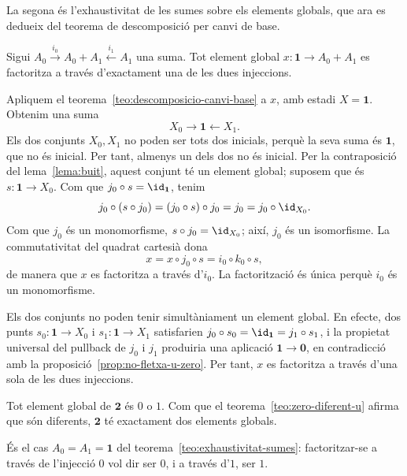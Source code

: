La segona és l'exhaustivitat de les sumes sobre els elements globals, que ara es dedueix del teorema de descomposició per canvi de base.

\begin{teorema}\label{teo:exhaustivitat-sumes}
Sigui \(A_0\xrightarrow{i_0}A_0+A_1\xleftarrow{i_1}A_1\) una suma. Tot element global \(x:\mathbf1\to A_0+A_1\) es factoritza a través d'exactament una de les dues injeccions.
\end{teorema}

\begin{prova}
Apliquem el teorema~\ref{teo:descomposicio-canvi-base} a \(x\), amb estadi \(X=\mathbf1\). Obtenim una suma
\[
X_0\longrightarrow\mathbf1\longleftarrow X_1.
\]
Els dos conjunts \(X_0,X_1\) no poden ser tots dos inicials, perquè la seva suma és \(\mathbf1\), que no és inicial. Per tant, almenys un dels dos no és inicial. Per la contraposició del lema~\ref{lema:buit}, aquest conjunt té un element global; suposem que és \(s:\mathbf1\to X_0\). Com que \(j_0\circ s=\id_{\mathbf1}\), tenim
\[
j_0\circ(s\circ j_0)=(j_0\circ s)\circ j_0=j_0=j_0\circ\id_{X_0}.
\]
Com que \(j_0\) és un monomorfisme, \(s\circ j_0=\id_{X_0}\); així, \(j_0\) és un isomorfisme. La commutativitat del quadrat cartesià dona
\[
x=x\circ j_0\circ s=i_0\circ k_0\circ s,
\]
de manera que \(x\) es factoritza a través d'\(i_0\). La factorització és única perquè \(i_0\) és un monomorfisme.

Els dos conjunts no poden tenir simultàniament un element global. En efecte, dos punts \(s_0:\mathbf1\to X_0\) i \(s_1:\mathbf1\to X_1\) satisfarien \(j_0\circ s_0=\id_{\mathbf1}=j_1\circ s_1\), i la propietat universal del pullback de \(j_0\) i \(j_1\) produiria una aplicació \(\mathbf1\to\mathbf0\), en contradicció amb la proposició~\ref{prop:no-fletxa-u-zero}. Per tant, \(x\) es factoritza a través d'una sola de les dues injeccions.
\end{prova}

\begin{corollari}\label{cor:elements-de-2}
Tot element global de \(\mathbf2\) és \(0\) o \(1\). Com que el teorema~\ref{teo:zero-diferent-u} afirma que són diferents, \(\mathbf2\) té exactament dos elements globals.
\end{corollari}

\begin{prova}
És el cas \(A_0=A_1=\mathbf1\) del teorema~\ref{teo:exhaustivitat-sumes}: factoritzar-se a través de l'injecció \(0\) vol dir ser \(0\), i a través d'\(1\), ser \(1\).
\end{prova}

